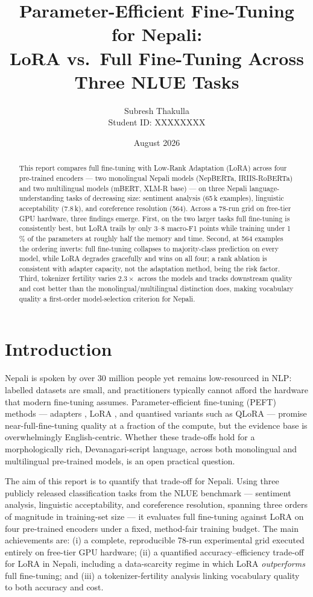 \documentclass[11pt,a4paper]{article}
\title{Parameter-Efficient Fine-Tuning for Nepali:\\
LoRA vs.\ Full Fine-Tuning Across Three NLUE Tasks}
\author{Subresh Thakulla\\Student ID: XXXXXXXX} %
\date{August 2026}
\begin{document}
\maketitle

\begin{abstract}
This report compares full fine-tuning with Low-Rank Adaptation (LoRA)
across four pre-trained encoders --- two monolingual Nepali models
(NepBERTa, IRIIS-RoBERTa) and two multilingual models (mBERT, XLM-R base)
--- on three Nepali language-understanding tasks of decreasing size:
sentiment analysis (65\,k examples), linguistic acceptability (7.8\,k),
and coreference resolution (564). Across a 78-run grid on free-tier GPU
hardware, three findings emerge. First, on the two larger tasks full
fine-tuning is consistently best, but LoRA trails by only 3--8 macro-F1
points while training under 1\,\% of the parameters at roughly half the
memory and time. Second, at 564 examples the ordering inverts: full
fine-tuning collapses to majority-class prediction on every model, while
LoRA degrades gracefully and wins on all four; a rank ablation is
consistent with adapter capacity, not the adaptation method, being the
risk factor. Third, tokenizer fertility varies $2.3\times$ across the
models and tracks downstream quality and cost better than the
monolingual/multilingual distinction does, making vocabulary quality a
first-order model-selection criterion for Nepali.
\end{abstract}

\section{Introduction}
\label{sec:intro}

Nepali is spoken by over 30 million people yet remains low-resourced in
NLP: labelled datasets are small, and practitioners typically cannot
afford the hardware that modern fine-tuning assumes. Parameter-efficient
fine-tuning (PEFT) methods --- adapters \citep{houlsby2019adapters}, LoRA
\citep{hu2022lora}, and quantised variants such as QLoRA
\citep{dettmers2023qlora} --- promise near-full-fine-tuning quality at a
fraction of the compute, but the evidence base is overwhelmingly
English-centric. Whether these trade-offs hold for a morphologically rich,
Devanagari-script language, across both monolingual and multilingual
pre-trained models, is an open practical question.

The aim of this report is to quantify that trade-off for Nepali. Using
three publicly released classification tasks from the NLUE benchmark
\citep{nyachhyon2025nlue} --- sentiment analysis, linguistic
acceptability, and coreference resolution, spanning three orders of
magnitude in training-set size --- it evaluates full fine-tuning against
LoRA on four pre-trained encoders under a fixed, method-fair training
budget. The main achievements are: (i) a complete, reproducible 78-run
experimental grid executed entirely on free-tier GPU hardware; (ii) a
quantified accuracy--efficiency trade-off for LoRA in Nepali, including a
data-scarcity regime in which LoRA \emph{outperforms} full fine-tuning;
and (iii) a tokenizer-fertility analysis linking vocabulary quality to
both accuracy and cost.
\end{document}
